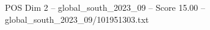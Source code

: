 \begin{textsample}{POS Dim 2 – global\_south\_2023\_09 – Score 15.00 – global\_south\_2023\_09/101951303.txt}
\end{textsample}
